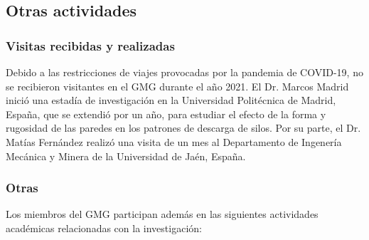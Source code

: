 \documentclass[a4paper,11pt,twoside,final,titlepage,onecolumn,openright]{report}
\begin{document}
\subsection{Otras actividades}

\subsubsection{Visitas recibidas y realizadas}
Debido a las restricciones de viajes provocadas por la pandemia de COVID-19, no se recibieron visitantes en el GMG durante el año 2021. El Dr. Marcos Madrid inició una estadía de investigación en la Universidad Politécnica de Madrid, España, que se extendió por un año, para estudiar el efecto de la forma y rugosidad de las paredes en los patrones de descarga de silos. Por su parte, el Dr. Matías Fernández realizó una visita de un mes al Departamento de Ingenería Mecánica y Minera de la Universidad de Jaén, España.

% 
% 
% 
%  

\subsubsection{Otras}

Los miembros del GMG participan además en las siguientes actividades académicas relacionadas con la investigación:
\end{document}
